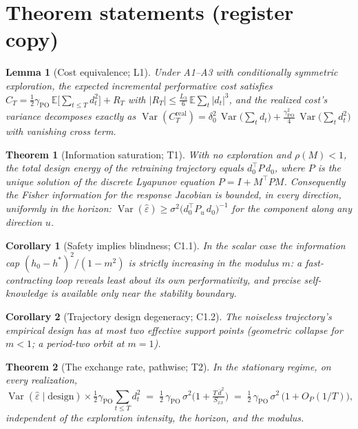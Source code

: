 \documentclass[11pt]{article}
\newtheorem{theorem}{Theorem}
\newtheorem{lemma}{Lemma}
\newtheorem{corollary}{Corollary}
\newcommand{\eps}{\varepsilon}
\newcommand{\gpo}{\gamma_{\mathrm{PO}}}
\newcommand{\hstar}{h^{*}}
\newcommand{\Sxx}{S_{xx}}
\newcommand{\Var}{\operatorname{Var}}
\newcommand{\E}{\mathbb{E}}
\newcommand{\dev}{d}
\begin{document}
\section*{Theorem statements (register copy)}


\begin{lemma}[Cost equivalence; L1]
Under A1--A3 with conditionally symmetric exploration, the expected
incremental performative cost satisfies
$C_T = \tfrac{1}{2}\gpo\,\E\!\big[\sum_{t\le T}\dev_t^2\big] + R_T$ with
$|R_T| \le \tfrac{L_3}{6}\,\E\sum_t |\dev_t|^3$, and the realized cost's
variance decomposes exactly as
$\Var(C_T^{\mathrm{real}}) = \delta_0^2\,\Var\!\big(\sum_t \dev_t\big)
+ \tfrac{\gpo^2}{4}\,\Var\!\big(\sum_t \dev_t^2\big)$
with vanishing cross term.
\end{lemma}

\begin{theorem}[Information saturation; T1]
With no exploration and $\rho(M)<1$, the total design energy of the
retraining trajectory equals $\dev_0^\top P\,\dev_0$, where $P$ is the
unique solution of the discrete Lyapunov equation $P = I + M^\top P M$.
Consequently the Fisher information for the response Jacobian is bounded,
in every direction, uniformly in the horizon:
$\Var(\hat\eps) \ge \sigma^2\big(\dev_0^\top P_u\,\dev_0\big)^{-1}$ for the
component along any direction $u$.
\end{theorem}

\begin{corollary}[Safety implies blindness; C1.1]
In the scalar case the information cap $(h_0-\hstar)^2/(1-m^2)$ is strictly
increasing in the modulus $m$: a fast-contracting loop reveals least about
its own performativity, and precise self-knowledge is available only near
the stability boundary.
\end{corollary}

\begin{corollary}[Trajectory design degeneracy; C1.2]
The noiseless trajectory's empirical design has at most two effective
support points (geometric collapse for $m<1$; a period-two orbit at
$m=1$).
\end{corollary}

\begin{theorem}[The exchange rate, pathwise; T2]
In the stationary regime, on every realization,
\[
\Var(\hat\eps \mid \mathrm{design}) \times \tfrac{1}{2}\gpo \sum_{t\le T}
\dev_t^2 \;=\; \tfrac{1}{2}\,\gpo\,\sigma^2\Big(1 +
\tfrac{T\,\bar{\dev}^2}{\Sxx}\Big)
\;=\; \tfrac{1}{2}\,\gpo\,\sigma^2\,\big(1 + O_P(1/T)\big),
\]
independent of the exploration intensity, the horizon, and the modulus.
\end{theorem}
\end{document}
